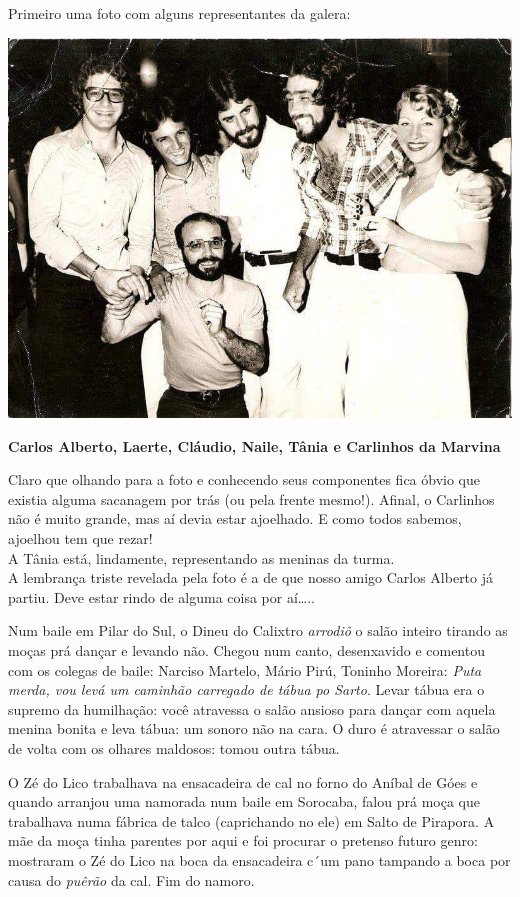 \documentclass[12pt,brazil,]{book}
\begin{document}
Primeiro uma foto com alguns representantes da galera:

\includegraphics{Imagens/TurmaSalto.jpeg}

\textbf{Carlos Alberto, Laerte, Cláudio, Naile, Tânia e Carlinhos da
Marvina}

Claro que olhando para a foto e conhecendo seus componentes fica óbvio
que existia alguma sacanagem por trás (ou pela frente mesmo!). Afinal, o
Carlinhos não é muito grande, mas aí devia estar ajoelhado. E como todos
sabemos, ajoelhou tem que rezar!\\
A Tânia está, lindamente, representando as meninas da turma.\\
A lembrança triste revelada pela foto é a de que nosso amigo Carlos
Alberto já partiu. Deve estar rindo de alguma coisa por aí\ldots{}..

Num baile em Pilar do Sul, o Dineu do Calixtro \emph{arrodiô} o salão
inteiro tirando as moças prá dançar e levando não. Chegou num canto,
desenxavido e comentou com os colegas de baile: Narciso Martelo, Mário
Pirú, Toninho Moreira: \emph{Puta merda, vou levá um caminhão carregado
de tábua po Sarto}. Levar tábua era o supremo da humilhação: você
atravessa o salão ansioso para dançar com aquela menina bonita e leva
tábua: um sonoro não na cara. O duro é atravessar o salão de volta com
os olhares maldosos: tomou outra tábua.

O Zé do Lico trabalhava na ensacadeira de cal no forno do Aníbal de Góes
e quando arranjou uma namorada num baile em Sorocaba, falou prá moça que
trabalhava numa fábrica de talco (caprichando no ele) em Salto de
Pirapora. A mãe da moça tinha parentes por aqui e foi procurar o
pretenso futuro genro: mostraram o Zé do Lico na boca da ensacadeira
c´um pano tampando a boca por causa do \emph{puêrão} da cal. Fim do
namoro.
\end{document}
